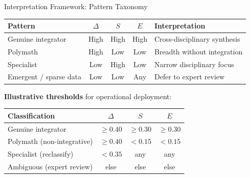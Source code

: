 \documentclass[aspectratio=169,10pt]{beamer}
\begin{document}
\begin{frame}{Interpretation Framework: Pattern Taxonomy}
\begin{table}
\centering\small
\begin{tabular}{@{}l ccc l@{}}
\toprule
\textbf{Pattern} & $\Delta$ & $S$ & $E$ & \textbf{Interpretation} \\
\midrule
Genuine integrator     & High & High & High & Cross-disciplinary synthesis \\
Polymath               & High & Low  & Low  & Breadth without integration \\
Specialist             & Low  & High & Low  & Narrow disciplinary focus \\
Emergent / sparse data & Low  & Low  & Any  & Defer to expert review \\
\bottomrule
\end{tabular}
\end{table}
\bigskip
\textbf{Illustrative thresholds} for operational deployment:
\begin{table}
\centering\small
\begin{tabular}{@{}l ccc@{}}
\toprule
\textbf{Classification} & $\Delta$ & $S$ & $E$ \\
\midrule
Genuine integrator           & $\geq 0.40$ & $\geq 0.30$ & $\geq 0.30$ \\
Polymath (non-integrative)   & $\geq 0.40$ & $< 0.15$    & $< 0.15$ \\
Specialist (reclassify)      & $< 0.35$    & any          & any \\
Ambiguous (expert review)    & else         & else         & else \\
\bottomrule
\end{tabular}
\end{table}
\end{frame}
\end{document}
